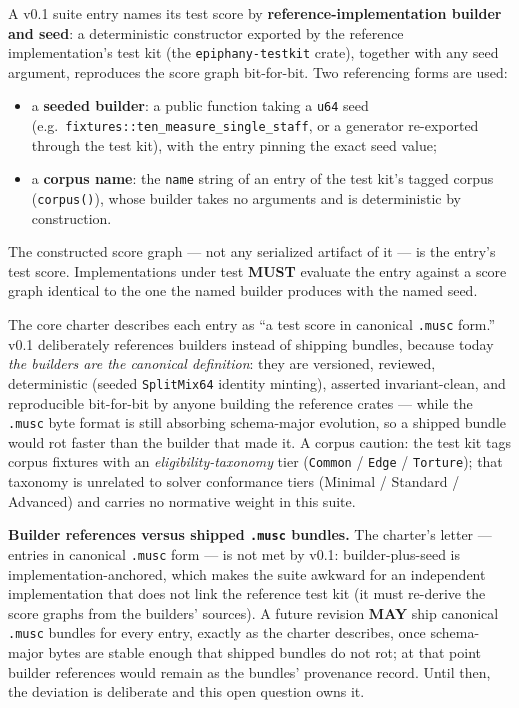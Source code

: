\documentclass[11pt,letterpaper]{report}
\newcounter{requirement}[chapter]
\newcommand{\MUST}{\textbf{MUST}}
\newcommand{\MAY}{\textbf{MAY}}
\begin{document}
\begin{requirement}
\label{req:refsuite:referencing}
A v0.1 suite entry names its test score by \textbf{reference-implementation
builder and seed}: a deterministic constructor exported by the reference
implementation's test kit (the \texttt{epiphany-testkit} crate), together
with any seed argument, reproduces the score graph bit-for-bit. Two
referencing forms are used:

\begin{itemize}
  \item a \textbf{seeded builder}: a public function taking a \texttt{u64}
    seed (e.g.\ \texttt{fixtures::ten\_measure\_single\_staff}, or a
    generator re-exported through the test kit), with the entry pinning
    the exact seed value;
  \item a \textbf{corpus name}: the \texttt{name} string of an entry of
    the test kit's tagged corpus (\texttt{corpus()}), whose builder takes
    no arguments and is deterministic by construction.
\end{itemize}

The constructed score graph --- not any serialized artifact of it --- is
the entry's test score. Implementations under test \MUST{} evaluate the
entry against a score graph identical to the one the named builder
produces with the named seed.
\end{requirement}

\begin{rationale}
The core charter describes each entry as ``a test score in canonical
\texttt{.musc} form.'' v0.1 deliberately references builders instead of
shipping bundles, because today \emph{the builders are the canonical
definition}: they are versioned, reviewed, deterministic (seeded
\texttt{SplitMix64} identity minting), asserted invariant-clean, and
reproducible bit-for-bit by anyone building the reference crates --- while
the \texttt{.musc} byte format is still absorbing schema-major evolution,
so a shipped bundle would rot faster than the builder that made it. A
corpus caution: the test kit tags corpus fixtures with an
\emph{eligibility-taxonomy} tier (\texttt{Common} / \texttt{Edge} /
\texttt{Torture}); that taxonomy is unrelated to solver conformance tiers
(Minimal / Standard / Advanced) and carries no normative weight in this
suite.
\end{rationale}

\begin{openquestion}
\textbf{Builder references versus shipped \texttt{.musc} bundles.} The
charter's letter --- entries in canonical \texttt{.musc} form --- is not met
by v0.1: builder-plus-seed is implementation-anchored, which makes the
suite awkward for an independent implementation that does not link the
reference test kit (it must re-derive the score graphs from the builders'
sources). A future revision \MAY{} ship canonical \texttt{.musc} bundles
for every entry, exactly as the charter describes, once schema-major
bytes are stable enough that shipped bundles do not rot; at that point
builder references would remain as the bundles' provenance record. Until
then, the deviation is deliberate and this open question owns it.
\end{openquestion}
\end{document}
